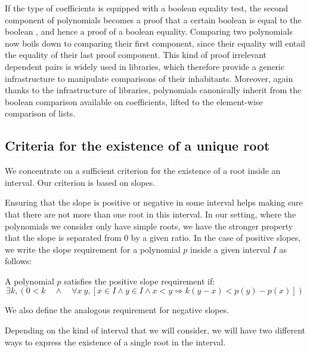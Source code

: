 \documentclass{mscs}
\begin{document}
If the type  of coefficients is equipped with a
boolean equality test, the second component of polynomials becomes a
proof that a certain boolean is equal to the boolean , and
hence a proof of a boolean equality. Comparing two polynomials now
boils down to comparing their first component, since their equality
will entail the equality of their last proof component. This
kind of proof irrelevant dependent pairs is widely used in \ssr{}
libraries, which therefore provide a generic infrastructure to
manipulate comparisons of their inhabitants. Moreover, again thanks
to the infrastructure of \ssr{} libraries, polynomials
canonically inherit from the boolean comparison available on
coefficients, lifted to the element-wise comparison of lists.


\subsection{Criteria for the existence of a unique root}
\label{sec:criteria}
We concentrate on a sufficient criterion for the existence of a root
inside an interval.  %
Our criterion is based on slopes.

Ensuring that the slope is positive or negative in some interval helps
making sure that there are not more than one root in this interval.  In our
setting, where the polynomials we consider only have simple roots, we
have the stronger
property that the slope is separated from 0 by a given ratio.  In the
case of positive slopes, we write the slope requirement for a
polynomial \(p\) inside a given interval \(I\) as follows:
\begin{definition}
A polynomial $p$ satisfies the positive slope requirement if:
\[\exists k, (0 < k \quad \wedge \quad \forall x\ y, [x \in I \wedge y \in I
\wedge x < y \Rightarrow k(y - x) < p(y) - p (x)]) \]
\end{definition}
We also define the analogous requirement for negative slopes.

Depending on the kind of interval that we will consider, we will have
two different ways to express the existence of a single root in the
interval.
\end{document}
